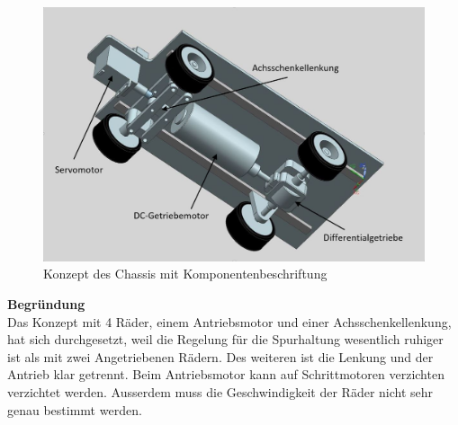 \begin{figure}[H]%
\centering
\includegraphics[width=1\textwidth]{03_Loesungskonzept/pictures/Chassis_1.JPG}
\caption{Konzept des Chassis mit Komponentenbeschriftung}
\label{fig:activityRoute}
\end{figure}\flushleft
\textbf{Begründung}
\\[0.2cm]
Das Konzept mit 4 Räder, einem Antriebsmotor und einer Achsschenkellenkung, hat sich durchgesetzt, weil die Regelung für die Spurhaltung wesentlich ruhiger ist als mit zwei Angetriebenen Rädern. Des weiteren ist die Lenkung und der Antrieb klar getrennt. Beim Antriebsmotor kann auf Schrittmotoren verzichten verzichtet werden. Ausserdem muss die Geschwindigkeit der Räder nicht sehr genau bestimmt werden.